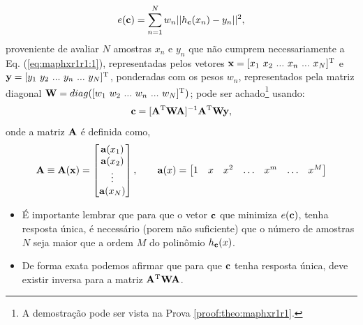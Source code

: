 \begin{theorem}
\begin{equation}\label{eq:maphxr1r1:2}
e(\VECTOR{c}) =  \sum_{n=1}^{N} w_n||h_{\VECTOR{c}}(x_n)-y_n||^2,
\end{equation}
proveniente de avaliar $N$ amostras $x_n$ e $y_n$ que não cumprem necessariamente a Eq. (\ref{eq:maphxr1r1:1}), 
representadas pelos vetores $\VECTOR{x}=[x_1~ x_2~ ...~ x_n~ ...~ x_N]^{\transpose}$ e $\VECTOR{y}=[y_1~ y_2~ ...~ y_n~ ...~ y_N]^{\transpose}$,
ponderadas com os pesos $w_n$, representados pela matriz diagonal $\MATRIX{W}=\funcdiag([w_1~ w_2~ ...~ w_n~ ...~ w_N]^{\transpose})$;
pode ser achado\footnote{A demostração pode ser vista na Prova \ref{proof:theo:maphxr1r1}.} usando:
\begin{equation}\label{eq:maphxr1r1:3}
\VECTOR{c}=[\MATRIX{A}^{\transpose}\MATRIX{W}\MATRIX{A}]^{-1}\MATRIX{A}^{\transpose}\MATRIX{W}\VECTOR{y},
\end{equation}
onde a matriz $\MATRIX{A}$ é definida como,
\begin{equation}\label{eq:maphxr1r1:4}
\MATRIX{A}\equiv \MATRIX{A}(\VECTOR{x})=\begin{bmatrix}
\VECTOR{a}(x_1)\\
\VECTOR{a}(x_2)\\
\vdots\\
\VECTOR{a}(x_N)\\
\end{bmatrix}, \qquad
\VECTOR{a}(x)=\begin{bmatrix}
1& x& x^2& \hdots & x^m& \hdots& x^M
\end{bmatrix}
\end{equation}

\end{theorem}


\begin{tcbattention}
\begin{itemize}
\item É importante lembrar que para que o vetor $\VECTOR{c}$
que minimiza $e(\VECTOR{c})$, tenha resposta única,
é necessário (porem não suficiente) que o número de amostras $N$ seja maior que a ordem $M$ do polinômio $h_{\VECTOR{c}}(x)$.

\item De forma exata podemos afirmar que para que $\VECTOR{c}$ tenha resposta única,
deve existir inversa para a matriz $\MATRIX{A}^{\transpose}\MATRIX{W}\MATRIX{A}$.

\end{itemize}
\end{tcbattention}


